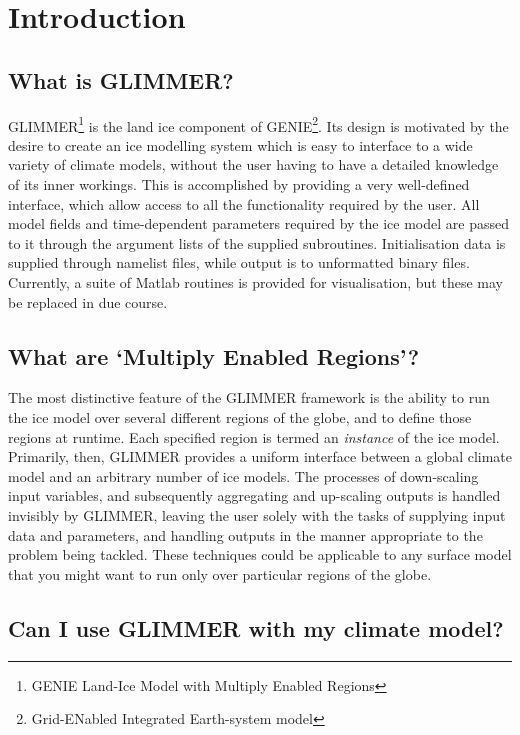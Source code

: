 \section{Introduction}

\subsection{What is GLIMMER?}

GLIMMER\footnote{GENIE Land-Ice Model with Multiply Enabled
Regions} is the land ice component of GENIE\footnote{Grid-ENabled
Integrated Earth-system model}. Its design is motivated by the desire to
create an ice modelling system which is easy to interface to a wide variety of
climate models, without 
the user having to have a detailed knowledge of its inner workings. This is
accomplished by providing a very well-defined interface, which allow access to
all the functionality required by the user. All model fields and
time-dependent parameters required by the ice model are passed to it through
the argument lists of the supplied subroutines. Initialisation data is
supplied through namelist files, while output is to unformatted binary
files. Currently, a suite of Matlab routines is provided for visualisation,
but these may be replaced in due course.

\subsection{What are `Multiply Enabled Regions'?}

The most distinctive feature of the GLIMMER framework is the ability to
run the ice model over several different regions of the globe, and to define
those regions at runtime. Each specified region is termed an \emph{instance}
of the ice model. Primarily, then, GLIMMER provides a uniform interface
between a global climate model and an arbitrary number of ice models. The
processes of down-scaling input variables, and subsequently aggregating and
up-scaling outputs is handled invisibly by GLIMMER, leaving the user solely
with the tasks of supplying input data and parameters, and handling outputs in
the manner appropriate to the problem being tackled. These techniques could be
applicable to any surface model that you might want to run only over
particular regions of the globe.

\subsection{Can I use GLIMMER with my climate model?}

